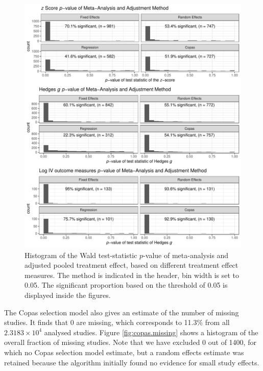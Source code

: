 \documentclass[11pt,a4paper,twoside]{book}\usepackage[]{graphicx}\usepackage[]{color}
\newenvironment{knitrout}{}{} %
\begin{document}
\begin{figure}
\begin{knitrout}
\color{fgcolor}

{\centering \includegraphics[width=\textwidth-3cm]{figure/ch03_figunnamed-chunk-19-1} 

}



\end{knitrout}
\caption{Histogram of the Wald test-statistic $p$-value of meta-analysis and adjusted pooled treatment effect, based on different treatment effect measures. The method is indicated in the header, bin width is set to 0.05. The significant proportion based on the threshold of 0.05 is displayed inside the figures.}
\label{fig:adjustment.stat}
\end{figure}

The Copas selection model also gives an estimate of the number of missing studies. It finds that 0 are missing, which corresponds to 11.3\% from all \ensuremath{2.3183\times 10^{4}} analysed studies. Figure \ref{fig:copas.missing} shows a histogram of the overall fraction of missing studies. Note that we have excluded 0 out of 1400, for which no Copas selection model estimate, but a random effects estimate was retained because the algorithm initially found no evidence for small study effects.
\end{document}
